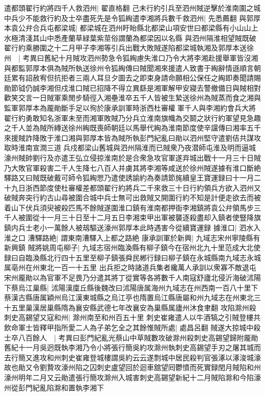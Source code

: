 遣都頭翟行約將四千人救泗州|{
	翟直格翻}
己未行約引兵至泗州賊逆擊於淮南圍之城中兵少不能救行約及士卒盡死先是令狐綯遣李湘將兵數千救泗州|{
	先悉薦翻}
與郭厚本袁公弁合兵屯都梁城|{
	都梁城在泗州盱眙縣北都梁山項安世曰都梁縣有小山山上水極清淺其山中悉產蘭草緑葉紫莖俗謂蘭為都梁因以名縣}
與泗州隔淮相望賊既破翟行約乘勝圍之十二月甲子李湘等引兵出戰大敗賊遂陷都梁城執湘及郭厚本送徐州　|{
	考異曰舊紀十月賊攻泗州勢急令狐綯慮失淮口乃令大將李湘赴援舉軍皆沒湘與都監郭厚本俱為賊所執送徐州令狐綯傳曰賊聞湘來援遣人致書于綯辭情遜順言朝廷累有詔赦宥但抗拒者三兩人耳旦夕圖去之即束身請命願相公保任之綯即奏聞請賜勛節钺仍誠李湘但戍淮口賊已招降不得立異繇是湘軍解甲安寢去警撤備日與賊相對歡笑交言一日賊軍乘閒步騎徑入湘壘淮卒五千人皆被生縶送徐州為賊蒸而食之湘與監軍郭厚本為龎勛斷手足以徇於康承訓軍時浙西杜審權軍千人與李湘約會兵大將翟行約勇敢知名浙軍未至而湘軍敗賊乃分兵立淮南旗幟為交鬬之狀行約軍望見急趣之千人並為賊所縳送徐州綯既喪師朝廷以馬舉代綯為淮南節度使辛讜傳曰湘率五千來援賊詐降敗于淮口湘與郭厚本皆為賊所執彭門紀亂曰勛以泗州堅守遣劉佶共謀攻取時淮南宣潤三道兵戍都梁山舊城與泗州隔淮而已賊衆乃夜潜師屯淮及明而逼城濠州賊帥劉行及亦遣王弘立侵掠淮南於是合衆急攻官軍遂弃城出戰十一月三十日賊乃大敗官軍殺害二千人生降七八百人并虜其將李湘等咸送於徐州賊遂據有淮口斷絶驛路又曰賊既破戴可師令狐綯愳乃遣使誘諭約為奏請節旄續皇王寶運録曰十一月二十九日浙西節度使杜審權差都頭翟行約將兵二千來救三十日行約領兵方欲入泗州又破賊奔突行約古山尋被圍合城中兵士無可出救賊又開圍行約不知是計便走欲去而被着山下伏兵須臾被殺匹馬不餘賊遂圍淮口鎮有淮南都押衙李湘鎮將袁公弁領馬步三千人被圍從十一月三十日至十二月五日李湘束甲出軍被襲逐殺盡却入鎮者使豎降旗鎮内兵士老小一萬餘人被刼驅送濠州郭厚本此時遇害今從續寶運録}
據淮口|{
	泗水入淮之口}
漕驛路絶|{
	謂東南漕驛入上都之路絶}
康承訓軍於新興|{
	九域志宋州寧陵縣有新興鎮}
賊將姚周屯柳子|{
	九域志宿州臨渙縣有柳子鎮今在宿州北九十里范成大北使録曰自臨渙縣北行四十五里至柳子鎮張舜民郴行録曰柳子鎮在永城縣南九域志永城属亳州在州東北一百一十五里}
出兵拒之時諸道兵集者纔萬人承訓以衆寡不敵退屯宋州龎勛以為官軍不足畏乃分遣其將丁從實等各將數千人南寇舒廬北侵沂海破沭陽下蔡烏江巢縣|{
	沭陽漢廩丘縣後魏改曰沭陽唐属海州九域志在州西南一百八十里下蔡漢古縣唐属穎州烏江漢東城縣之烏江亭也隋置烏江縣唐屬和州九域志在州東北三十五里巢漢居巢縣隋為襄安縣武德七年改襄安為巢縣属廬州沐食聿翻}
攻陷滁州殺刺史高錫望又寇和州|{
	滁州南至和州百五十里}
刺史崔雍遣人以牛酒犒之引賊登樓共飲命軍士皆釋甲指所愛二人為子弟乞全之其餘惟賊所處|{
	處昌呂翻}
賊遂大掠城中殺士卒八百餘人　|{
	考異曰彭門紀亂光蔡山中草賊數攻破滁州殺刺史高錫望歸附龎勛舊紀十一月吳迥既執李湘乃令小將張行簡吳約攻滁州執刺史高錫望手刃之屠其城而去行簡又進攻和州刺史崔雍登城樓謂吳約云云遂剽城中居民殺判官張涿以涿浚城濠故也勛又令劉贄攻濠州陷之囚刺史盧望回於迴車舘望囘鬱憤而死實録閏月賊陷和州濠州明年二月又云勛遣張行簡攻滁州入城害刺史高錫望新紀十二月賊陷滁和今陷濠州從彭門紀亂陷滁和置執李湘下}
